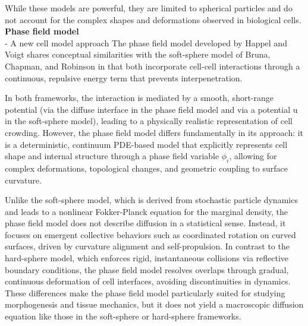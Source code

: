 While these models are powerful, they are limited to spherical particles and do not account for the complex shapes and deformations observed in biological cells.  \\


\textbf{Phase field model} \\
- A new cell model approach  
The phase field model developed by Happel and Voigt \cite{HV23} shares conceptual similarities with the soft-sphere model of Bruna, Chapman, and Robinson \cite{BCR17} in that both incorporate cell-cell interactions through a continuous, repulsive energy term that prevents interpenetration. 

In both frameworks, the interaction is mediated by a smooth, short-range potential (via the diffuse interface in the phase field model and via a potential 
u in the soft-sphere model), leading to a physically realistic representation of cell crowding. 
However, the phase field model differs fundamentally in its approach: it is a deterministic, continuum PDE-based model that explicitly represents cell shape and internal structure through a phase field variable $\phi_i​$, allowing for complex deformations, topological changes, and geometric coupling to surface curvature. 

Unlike the soft-sphere model, which is derived from stochastic particle dynamics and leads to a nonlinear Fokker-Planck equation for the marginal density, the phase field model does not describe diffusion in a statistical sense. 
Instead, it focuses on emergent collective behaviors such as coordinated rotation on curved surfaces, driven by curvature alignment and self-propulsion. 
In contrast to the hard-sphere model, which enforces rigid, instantaneous collisions via reflective boundary conditions, the phase field model resolves overlaps through gradual, continuous deformation of cell interfaces, avoiding discontinuities in dynamics. 
These differences make the phase field model particularly suited for studying morphogenesis and tissue mechanics, but it does not yield a macroscopic diffusion equation like those in the soft-sphere or hard-sphere frameworks.



